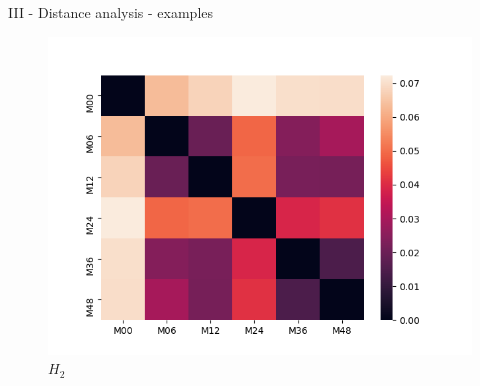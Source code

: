 \documentclass[aspectratio=169, 10pt, dvipsnames]{beamer}
\begin{document}
\begin{frame}[fragile]{III - Distance analysis - examples}
  \endminipage
  \hfill
  \begin{figure}
    \centering
    \includegraphics[width=\textwidth]{figures/temporal_evolution/ADNI029S0878_h_2.png}
    \caption{$H_2$}
  \end{figure}
  \endminipage
\end{frame}
\end{document}
